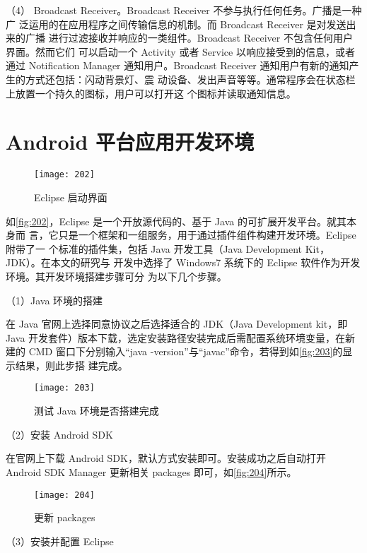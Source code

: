 （4） Broadcast Receiver。Broadcast Receiver 不参与执行任何任务。广播是一种广
泛运用的在应用程序之间传输信息的机制。而 Broadcast Receiver 是对发送出来的广播
进行过滤接收并响应的一类组件。Broadcast Receiver 不包含任何用户界面。然而它们
可以启动一个 Activity 或者 Service 以响应接受到的信息，或者通过 Notification Manager
通知用户。Broadcast Receiver 通知用户有新的通知产生的方式还包括：闪动背景灯、震
动设备、发出声音等等。通常程序会在状态栏上放置一个持久的图标，用户可以打开这
个图标并读取通知信息。

\section{Android 平台应用开发环境}
\begin{figure}[htbp]
    \centering
    \texttt{[image: 202]}
    \caption{\label{fig:202}Eclipse 启动界面}
\end{figure}
如\autoref{fig:202}，Eclipse 是一个开放源代码的、基于 Java 的可扩展开发平台。就其本身而
言，它只是一个框架和一组服务，用于通过插件组件构建开发环境。Eclipse 附带了一
个标准的插件集，包括 Java 开发工具（Java Development Kit，JDK）。在本文的研究与
开发中选择了 Windows7 系统下的 Eclipse 软件作为开发环境。其开发环境搭建步骤可分
为以下几个步骤\cite{7}。

（1）Java 环境的搭建

在 Java 官网上选择同意协议之后选择适合的 JDK（Java Development kit，即 Java
开发套件）版本下载，选定安装路径安装完成后需配置系统环境变量，在新建的 CMD
窗口下分别输入“java -version”与“javac”命令，若得到如\autoref{fig:203}的显示结果，则此步搭
建完成。

\begin{figure}[htbp]
    \centering
    \texttt{[image: 203]}
    \caption{\label{fig:203}测试 Java 环境是否搭建完成}
\end{figure}

（2）安装 Android SDK

在官网上下载 Android SDK，默认方式安装即可。安装成功之后自动打开 Android
SDK Manager 更新相关 packages 即可，如\autoref{fig:204}所示。

\newpage

\begin{figure}[htbp]
    \centering
    \texttt{[image: 204]}
    \caption{\label{fig:204}更新 packages}
\end{figure}

（3）安装并配置 Eclipse

